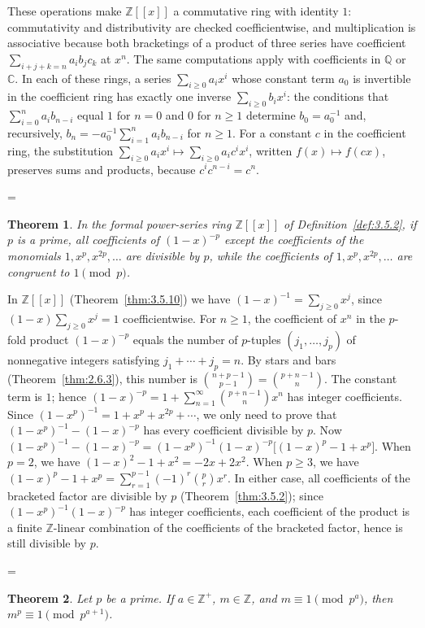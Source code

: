 \documentclass[11pt]{article}
\makeatletter
\theoremstyle{ntstyle}
\newtheorem{theorem}{Theorem}[subsection]
\let\nt@closedisplay\]
\def\nt@guardedclose{\@ifnextchar\par{\nt@closeafterpar}{\@ifnextchar\end{\postdisplaypenalty\@M\nt@closedisplay}{\nt@closedisplay}}}
\def\nt@closeafterpar\par{\@ifnextchar\par{\nt@closeafterpar}{\@ifnextchar\end{\postdisplaypenalty\@M\nt@closedisplay\par}{\nt@closedisplay\par}}}
\renewenvironment{proof}[1][\proofname]{\par
  \pushQED{\qed}\normalfont\topsep\medskipamount\edef\nt@afterproof{\@endparpenalty=\the\@endparpenalty\relax}\@beginparpenalty\@M\@endparpenalty\@M\let\]\nt@guardedclose\trivlist\item[]\textit{#1\@addpunct{.}} \ignorespaces}{\ifvmode\addpenalty\@M\fi\popQED\nt@afterproof\endtrivlist\@endpefalse}
\makeatother
\begin{document}
\begin{proof} These operations make $\mathbb{Z}[[x]]$ a commutative ring with identity
	$1$: commutativity and distributivity are checked coefficientwise, and
	multiplication is associative because both bracketings of a product of
	three series have coefficient $\sum_{i+j+k=n}a_ib_jc_k$ at $x^n$.
	The same computations apply with coefficients in $\mathbb{Q}$ or $\mathbb{C}$.
	In each of these rings, a series
	$\sum_{i\ge0}a_ix^i$ whose constant term $a_0$ is invertible in the
	coefficient ring has exactly one inverse $\sum_{i\ge0}b_ix^i$: the
	conditions that $\sum_{i=0}^{n}a_ib_{n-i}$ equal $1$ for $n=0$ and $0$ for
	$n\ge1$ determine $b_0=a_0^{-1}$ and, recursively,
	$b_n=-a_0^{-1}\sum_{i=1}^{n}a_ib_{n-i}$ for $n\ge1$. For a constant $c$ in the
	coefficient ring, the substitution $\sum_{i\ge0}a_ix^i\mapsto\sum_{i\ge0}a_ic^ix^i$,
	written $f(x)\mapsto f(cx)$, preserves sums and products, because
	$c^ic^{n-i}=c^n$.

\end{proof}
\begin{theorem}\label{thm:3.5.11} In the formal power-series ring
	$\mathbb{Z}[[x]]$ of Definition~\ref{def:3.5.2}, if $p$ is a prime, all coefficients of $(1-x)^{-p}$ except the coefficients of the monomials $1, x^{p}, x^{2p}, \ldots$ are divisible by $p$, while the coefficients of $1, x^{p}, x^{2p},
		\ldots$ are congruent to $1 \pmod{p}$.

\end{theorem}

\begin{proof} In $\mathbb{Z}[[x]]$ (Theorem~\ref{thm:3.5.10}) we have
	$(1-x)^{-1} = \sum_{j\ge0} x^{j}$, since
	$(1-x)\sum_{j\ge0}x^{j} = 1$ coefficientwise. For $n\ge1$, the coefficient of $x^{n}$ in the $p$-fold product
	$(1-x)^{-p}$ equals the number of
	$p$-tuples $(j_1,\ldots,j_p)$ of nonnegative integers satisfying
	$j_1+\cdots+j_p=n$. By stars and bars (Theorem~\ref{thm:2.6.3}), this
	number is $\binom{n+p-1}{p-1} = \binom{p+n-1}{n}$. The constant term is $1$; hence
	$(1-x)^{-p} = 1 + \sum_{n=1}^{\infty}
		\binom{p+n-1}{n} x^{n}$ has integer coefficients. Since
	$(1-x^{p})^{-1} = 1 + x^{p} + x^{2p} + \cdots$, we only need to prove that
	$(1-x^{p})^{-1} - (1-x)^{-p}$ has every coefficient divisible by $p$.
	Now $(1-x^{p})^{-1} - (1-x)^{-p} =
		(1-x^{p})^{-1}(1-x)^{-p}\big[(1-x)^{p} - 1 + x^{p}\big]$. When $p =
		2$, we have $(1-x)^{2} - 1 + x^{2} = -2x + 2x^{2}$. When $p \ge 3$,
	we have $(1-x)^{p} - 1 + x^{p} = \sum_{r=1}^{p-1} (-1)^{r} \binom{p}{r}
		x^{r}$. In either case, all coefficients of the bracketed factor are divisible by $p$
	(Theorem~\ref{thm:3.5.2}); since $(1-x^{p})^{-1}(1-x)^{-p}$ has integer coefficients, each
	coefficient of the product is a finite $\mathbb{Z}$-linear combination of the coefficients of the bracketed factor,
	hence is still divisible by $p$.

\end{proof}
\begin{theorem}\label{thm:3.5.12} Let $p$
	be a prime. If $a \in \mathbb{Z}^+$, $m\in\mathbb{Z}$, and $m \equiv 1 \pmod{p^{a}}$, then $m^{p}
		\equiv 1 \pmod{p^{a+1}}$.

\end{theorem}
\end{document}
